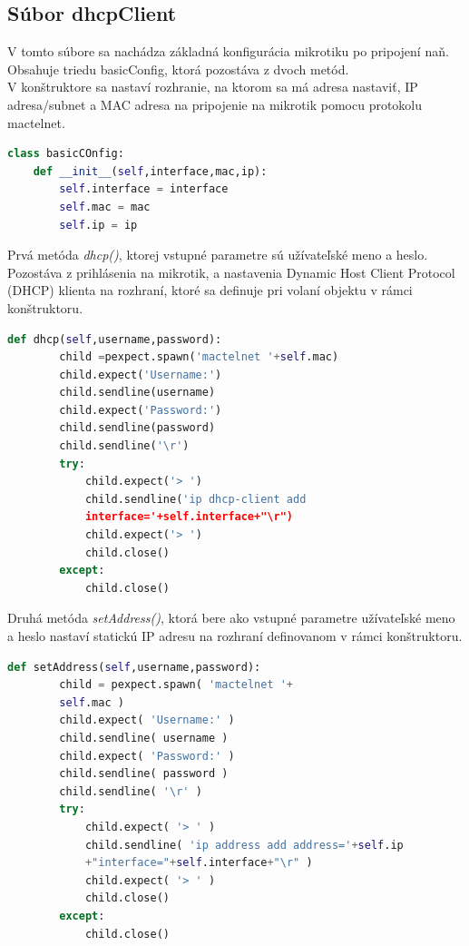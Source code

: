 \subsection{Súbor dhcpClient}
V tomto súbore sa nachádza základná konfigurácia mikrotiku po pripojení naň. Obsahuje triedu basicConfig, ktorá pozostáva z dvoch metód.\\
V konštruktore sa nastaví rozhranie, na ktorom sa má adresa nastaviť, IP adresa/subnet a MAC adresa na pripojenie na mikrotik pomocu protokolu mactelnet.
\begin{lstlisting}[language=python, frame=single, caption=Trieda basicConfig,captionpos=b, showstringspaces=false, basicstyle=\footnotesize]
 class basicCOnfig:
    def __init__(self,interface,mac,ip):
        self.interface = interface
        self.mac = mac
        self.ip = ip
\end{lstlisting}
Prvá metóda \textit{dhcp()}, ktorej vstupné parametre sú užívateľské meno a heslo. Pozostáva z prihlásenia na mikrotik, a nastavenia Dynamic Host Client Protocol (DHCP) klienta na rozhraní, ktoré sa definuje pri volaní objektu v rámci konštruktoru.
\newpage
\begin{lstlisting}[language=python, frame=single, caption=Metóda dhcp,captionpos=b, showstringspaces=false, basicstyle=\footnotesize]
 def dhcp(self,username,password):
        child =pexpect.spawn('mactelnet '+self.mac)
        child.expect('Username:')
        child.sendline(username)
        child.expect('Password:')
        child.sendline(password)
        child.sendline('\r')
        try:
            child.expect('> ')
            child.sendline('ip dhcp-client add 
            interface='+self.interface+"\r")
            child.expect('> ')
            child.close()
        except:
            child.close()
\end{lstlisting}
Druhá metóda \textit{setAddress()}, ktorá bere ako vstupné parametre užívateľské meno a heslo nastaví statickú IP adresu na rozhraní definovanom v rámci konštruktoru.
\begin{lstlisting}[language=python, frame=single, caption=Metóda setAddress,captionpos=b, showstringspaces=false, basicstyle=\footnotesize]
 def setAddress(self,username,password):
        child = pexpect.spawn( 'mactelnet '+ 
        self.mac )
        child.expect( 'Username:' )
        child.sendline( username )
        child.expect( 'Password:' )
        child.sendline( password )
        child.sendline( '\r' )
        try:
            child.expect( '> ' )
            child.sendline( 'ip address add address='+self.ip 
            +"interface="+self.interface+"\r" )
            child.expect( '> ' )
            child.close()
        except:
            child.close()
\end{lstlisting}

